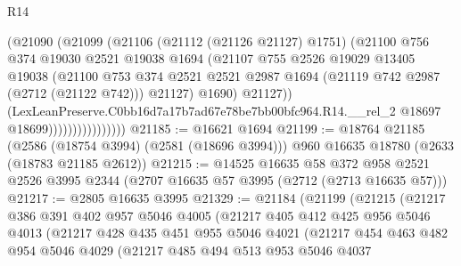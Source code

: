 \begin{lexlean}{R14}
\begin{coremodule}
                              (@21090
                                (@21099
                                  (@21106
                                    (@21112 (@21126 @21127) @1751)
                                    (@21100
                                      @756
                                      @374
                                      @19030
                                      @2521
                                      @19038
                                      @1694
                                      (@21107
                                        @755
                                        @2526
                                        @19029
                                        @13405
                                        @19038
                                        (@21100
                                          @753
                                          @374
                                          @2521
                                          @2521
                                          @2987
                                          @1694
                                          (@21119 @742 @2987 (@2712 (@21122 @742)))
                                          @21127)
                                        @1690)
                                      @21127))
                                  (LexLeanPreserve.C0bb16d7a17b7ad67e78be7bb00bfc964.R14.__rel_2
                                    @18697
                                    @18699))))))))))))))))
@21185 := @16621 @1694
@21199 := @18764
    @21185
    (@2586 (@18754 @3994) (@2581 (@18696 @3994)))
    @960
    @16635
    @18780
    (@2633 (@18783 @21185 @2612))
@21215 := @14525
    @16635
    @58
    @372
    @958
    @2521
    @2526
    @3995
    @2344
    (@2707 @16635 @57 @3995 (@2712 (@2713 @16635 @57)))
@21217 := @2805 @16635 @3995
@21329 := @21184
    (@21199
      (@21215
        (@21217
          @386
          @391
          @402
          @957
          @5046
          @4005
          (@21217
            @405
            @412
            @425
            @956
            @5046
            @4013
            (@21217
              @428
              @435
              @451
              @955
              @5046
              @4021
              (@21217
                @454
                @463
                @482
                @954
                @5046
                @4029
                (@21217
                  @485
                  @494
                  @513
                  @953
                  @5046
                  @4037

\end{coremodule}
\end{lexlean}
